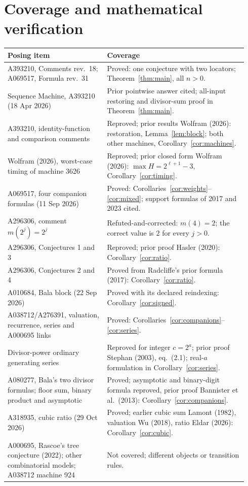 \documentclass[11pt]{article}
\begin{document}
\section{Coverage and mathematical verification}
\begin{center}
\small
\begin{tabular}{@{}>{\raggedright\arraybackslash}p{0.39\linewidth}>{\raggedright\arraybackslash}p{0.55\linewidth}@{}}
\toprule
Posing item & Coverage\\\midrule
A393210, Comments rev.~18; A069517, Formula rev.~31 & Proved: one conjecture with two locators; Theorem~\ref{thm:main}, all $n>0$.\\
Sequence Machine, A393210 (18 Apr 2026) & Prior pointwise answer cited; all-input restoring and divisor-sum proof in Theorem~\ref{thm:main}.\\
A393210, identity-function and comparison comments & Reproved; prior results Wolfram (2026): restoration, Lemma~\ref{lem:block}; both other machines, Corollary~\ref{cor:machines}.\\
Wolfram (2026), worst-case timing of machine 3626 & Reproved; prior closed form Wolfram (2026): $\max H=2^{\ell+1}-3$, Corollary~\ref{cor:timing}.\\
A069517, four companion formulas (11 Sep 2026) & Proved: Corollaries~\ref{cor:weights}--\ref{cor:mixed}; support formulas of 2017 and 2023 cited.\\
A296306, comment $m(2^j)=2^j$ & Refuted-and-corrected: $m(4)=2$; the correct value is $2$ for every $j>0$.\\
A296306, Conjectures 1 and 3 & Reproved; prior proof Hasler (2020): Corollary~\ref{cor:ratio}.\\
A296306, Conjectures 2 and 4 & Proved from Radcliffe's prior formula (2017): Corollary~\ref{cor:ratio}.\\
A010684, Bala block (22 Sep 2026) & Proved with its declared reindexing: Corollary~\ref{cor:signed}.\\
A038712/A276391, valuation, recurrence, series and A000695 links & Proved: Corollaries~\ref{cor:companions}--\ref{cor:series}.\\
Divisor-power ordinary generating series & Reproved for integer $c=2^a$; prior proof Stephan (2003), eq.~(2.1); real-$a$ formulation in Corollary~\ref{cor:series}.\\
A080277, Bala's two divisor formulas; floor sum, binary product and asymptotic & Proved; asymptotic and binary-digit formula reproved, prior proof Bannister et al.\ (2013): Corollary~\ref{cor:companions}.\\
A318935, cubic ratio (29 Oct 2026) & Proved; earlier cubic sum Lamont (1982), valuation Wu (2018), ratio Eldar (2026): Corollary~\ref{cor:cubic}.\\
A000695, Rascoe's tree conjecture (2022); other combinatorial models; A038712 machine 924 & Not covered; different objects or transition rules.\\
\bottomrule
\end{tabular}
\end{center}
\end{document}
